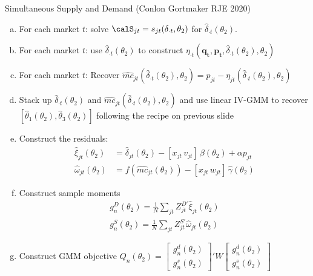 \begin{frame}{Simultaneous Supply and Demand (Conlon Gortmaker RJE 2020)}
\tiny
\begin{enumerate}[(a)]
\item For each market $t$: solve $\calS_{jt} = s_{jt}(\delta_{\cdot t},\theta_2)$ for $\widehat{\delta}_{\cdot t}(\theta_2)$.
\item For each market $t$: use $\widehat{\delta}_{\cdot t}(\theta_2)$ to construct $\eta_{\cdot 
t}(\symbf{q_t},\symbf{p_t},\widehat{\delta}_{\cdot t}(\theta_2),\theta_2)$
\item For each market $t$: Recover $\widehat{mc}_{jt}(\widehat{\delta}_{\cdot t}(\theta_2),\theta_2) = p_{jt} - \eta_{jt}(\widehat{\delta}_{\cdot t}(\theta_2),\theta_2)$
\item Stack up $\widehat{\delta}_{\cdot t}(\theta_2)$ and $\widehat{mc}_{jt}(\widehat{\delta}_{\cdot t}(\theta_2),\theta_2)$ and use linear IV-GMM to recover $[\widehat{\theta}_1(\theta_2), \widehat{\theta}_3(\theta_2) ]$ following the recipe on previous slide
\item Construct the residuals:
\begin{align*}
\nonumber    \widehat{\xi}_{jt}(\theta_2) &= \widehat{\delta}_{jt}(\theta_2) -   [x_{jt}\, v_{jt}]\, \widehat{\beta}(\theta_2) + \alpha p_{jt}\\
    \widehat{\omega}_{jt}(\theta_2) &= f(\widehat{mc}_{jt}(\theta_2)) -  [x_{jt}\, w_{jt}]\, \widehat{\gamma}(\theta_2)
\end{align*}
\item Construct sample moments
\begin{align*}
\nonumber g_n^D(\theta_2)=\frac{1}{N} \sum_{jt} Z_{jt}^{D\prime} \widehat{\xi}_{jt}(\theta_2)\\
 g_n^S(\theta_2)=\frac{1}{N} \sum_{jt} Z_{jt}^{S \prime} \widehat{\omega}_{jt}(\theta_2)
\end{align*}
\item Construct GMM objective $Q_n(\theta_2)= \left[ {\begin{array}{c} g_n^d(\theta_2) \\ g_n^s(\theta_2) \end{array} } \right]' W  \left[ {\begin{array}{c} g_n^d(\theta_2) \\ g_n^s(\theta_2) \end{array} } \right] $
\end{enumerate}
\end{frame}

